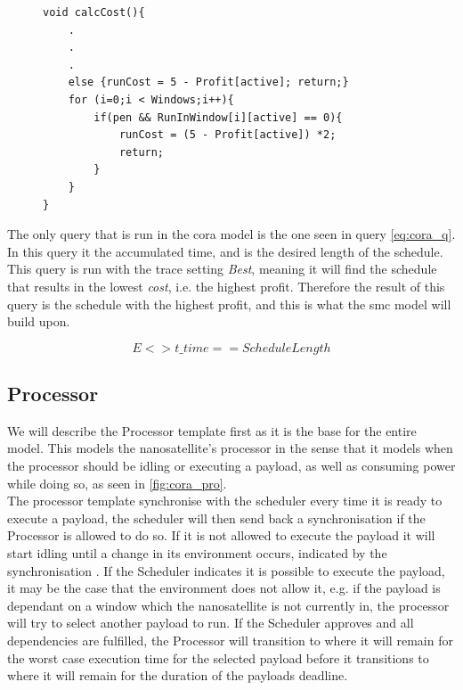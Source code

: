 \begin{figure}[h]
	\begin{lstlisting}[language=my_c, caption={Function calcCost(), used for calculating the cost rate}, label=lst:calcCost]
void calcCost(){
	.
	.
	.
	else {runCost = 5 - Profit[active]; return;}
	for (i=0;i < Windows;i++){ 
		if(pen && RunInWindow[i][active] == 0){
			runCost = (5 - Profit[active]) *2;
			return;
		} 
	}
}	
	\end{lstlisting}
\end{figure}


The only query that is run in the \gls{cora} model is the one seen in query \ref{eq:cora_q}.
In this query  it the accumulated time, and  is the desired length of the schedule.
This query is run with the trace setting \textit{Best}, meaning it will find the schedule that results in the lowest \textit{cost}, i.e. the highest profit.
Therefore the result of this query is the schedule with the highest profit, and this is what the \gls{smc} model will build upon.

\begin{equation} \label{eq:cora_q}
E<> t\_time == ScheduleLength
\end{equation}

\subsection*{Processor} \label{ssec:cora_pro}
We will describe the Processor template first as it is the base for the entire model.
This models the nanosatellite's processor in the sense that it models when the processor should be idling or executing a payload, as well as consuming power while doing so, as seen in \cref{fig:cora_pro}.\\
The processor template synchronise with the scheduler every time it is ready to execute a payload, the scheduler will then send back a synchronisation if the Processor is allowed to do so.
If it is not allowed to execute the payload it will start idling until a change in its environment occurs, indicated by the synchronisation .
If the Scheduler indicates it is possible to execute the payload, it may be the case that the environment does not allow it, e.g. if the payload is dependant on a window which the nanosatellite is not currently in, the processor will try to select another payload to run.
If the Scheduler approves and all dependencies are fulfilled, the Processor will transition to  where it will remain for the worst case execution time for the selected payload before it transitions to  where it will remain for the duration of the payloads deadline.

